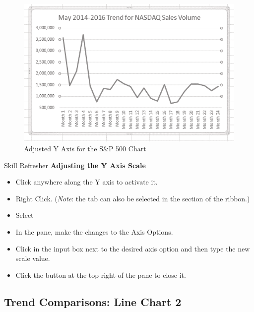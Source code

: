 \begin{figure}[H]
	\centering
	\includegraphics[width=\maxwidth{.95\linewidth}]{gfx/ch04_fig06}
	\caption{Adjusted Y Axis for the S\&P 500 Chart}
	\label{04:fig06}
\end{figure}

\begin{center}
	\begin{sklbox}{Skill Refresher}
		\textbf{Adjusting the Y Axis Scale}
		\\
		\begin{itemize}
			\setlength{\itemsep}{0pt}
			\setlength{\parskip}{0pt}
			\setlength{\parsep}{0pt}

			\item Click anywhere along the Y axis to activate it.
			\item Right Click. (\textit{Note}: the  tab can also be selected in the  section of the ribbon.)
			\item Select 
			\item In the  pane, make the changes to the Axis Options.
			\item Click in the input box next to the desired axis option and then type the new scale value.
			\item Click the  button at the top right of the  pane to close it.
			
		\end{itemize}
	\end{sklbox}
\end{center}

\subsection{Trend Comparisons: Line Chart 2}

